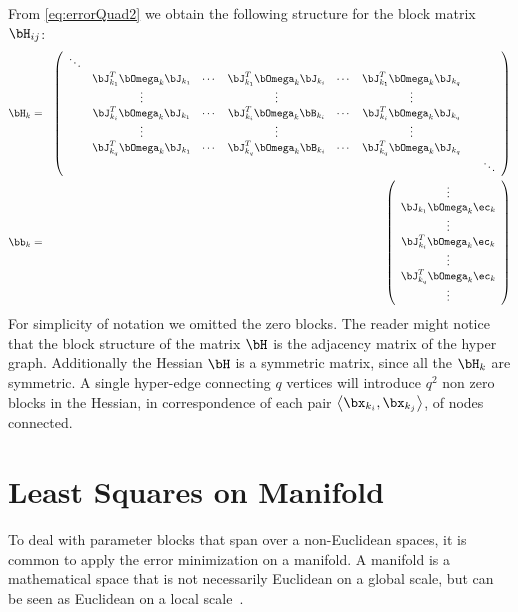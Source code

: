 \documentclass[a4paper]{article}
\begin{document}
From \eqref{eq:errorQuad2} we obtain the following structure for the block matrix $\bH_{ij}$:
\begin{eqnarray}
\bH_{k}&=&\left(
\begin{array}{cccccccc}
\ddots & & & & & & &\\
& \bJ_{k_1}^T \bOmega_{k} \bJ_{k_1} & \cdots & \bJ_{k_1}^T \bOmega_{k} \bJ_{k_i} & \cdots & \bJ_{k_1}^T \bOmega_{k} \bJ_{k_q} &\\
& \vdots & & \vdots & & \vdots & \\
& \bJ_{k_i}^T \bOmega_{k} \bJ_{k_1} & \cdots & \bJ_{k_i}^T \bOmega_{k} \bB_{k_i} & \cdots & \bJ_{k_i}^T \bOmega_{k} \bJ_{k_q} & \\
& \vdots & & \vdots & & \vdots & \\
& \bJ_{k_q}^T \bOmega_{k} \bJ_{k_1} & \cdots & \bJ_{k_q}^T \bOmega_{k} \bB_{k_i} & \cdots & \bJ_{k_q}^T \bOmega_{k} \bJ_{k_q} & \\
& &&&&&& \ddots \\
\end{array}
\right) \\
\bb_{k}&=&\left(
\begin{array}{c}
\vdots\\
\bJ_{k_1} \bOmega_{k} \ec_{k}\\
\vdots\\
\bJ_{k_i}^T \bOmega_{k} \ec_{k}\\
\vdots\\
\bJ_{k_q}^T \bOmega_{k} \ec_{k}\\
\vdots\\
\end{array}
\right) 
\end{eqnarray}
For simplicity of notation we omitted the zero blocks.  The reader
might notice that the block structure of the matrix $\bH$ is the
adjacency matrix of the hyper graph.  Additionally the Hessian $\bH$
is a symmetric matrix, since all the $\bH_k$ are symmetric. A single
hyper-edge connecting $q$ vertices will introduce $q^2$ non zero
blocks in the Hessian, in correspondence of each pair $\left<
\bx_{k_i}, \bx_{k_j} \right>$, of nodes connected.


\section{Least Squares on Manifold}
\label{sec:manifold}

To deal with parameter blocks that span over a non-Euclidean spaces,
it is common to apply the error minimization on a manifold.  A
manifold is a mathematical space that is not necessarily Euclidean on
a global scale, but can be seen as Euclidean on a local
scale~\cite{Lee2003SmoothManifolds}.
\end{document}
